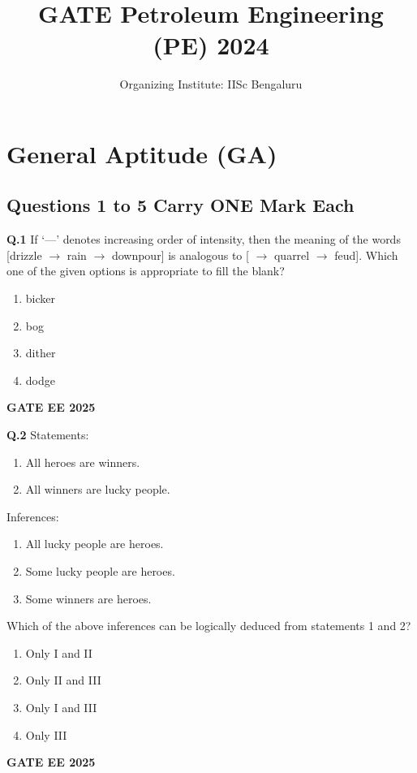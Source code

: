 \documentclass{article}
\title{GATE Petroleum Engineering (PE) 2024}
\author{Organizing Institute: IISc Bengaluru}
\date{}
\begin{document}
\maketitle

\section*{General Aptitude (GA)}

\subsection*{Questions 1 to 5 Carry ONE Mark Each}

\textbf{Q.1} If ‘---’ denotes increasing order of intensity, then the meaning of the words [drizzle $\rightarrow$ rain $\rightarrow$ downpour] is analogous to [\underline{\hspace{1.5cm}} $\rightarrow$ quarrel $\rightarrow$ feud]. Which one of the given options is appropriate to fill the blank?
\begin{enumerate}[label=(\Alph*)]
    \item bicker
    \item bog
    \item dither
    \item dodge
\end{enumerate}
\textbf{GATE EE 2025}

\vspace{0.5cm}

\textbf{Q.2} Statements: 
\begin{enumerate}
    \item All heroes are winners.
    \item All winners are lucky people.
\end{enumerate}
Inferences:
\begin{enumerate}[label=(\Roman*)]
    \item All lucky people are heroes.
    \item Some lucky people are heroes.
    \item Some winners are heroes.
\end{enumerate}
Which of the above inferences can be logically deduced from statements 1 and 2?
\begin{enumerate}[label=(\Alph*)]
    \item Only I and II
    \item Only II and III
    \item Only I and III
    \item Only III
\end{enumerate}
\textbf{GATE EE 2025}
\end{document}
